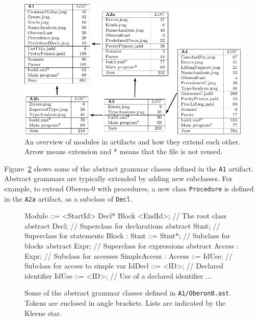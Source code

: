 \begin{figure}[h]
\begin{center}
\includegraphics{jastadd/artifacts-overview.pdf}
\caption{An overview of modules in artifacts and how they extend each other. Arrow means extension and * means that the file is not reused.}
\label{JA-ArtifactsOverview}
\end{center}
\end{figure}

Figure~\ref{JA-AbsGram} shows some of the abstract grammar classes defined in the \texttt{A1} artifact. Abstract grammars are typically extended by adding new subclasses. For example, to extend Oberon-0 with procedures, a new class \texttt{Procedure} is defined in the \texttt{A2a} artifact, as a subclass of \texttt{Decl}.

\begin{figure}[h]\footnotesize
\begin{jastaddcode}
Module ::= <StartId> Decl* Block <EndId>; // The root class
abstract Decl;                     // Superclass for declarations
abstract Stmt;                     // Superclass for statements
Block : Stmt ::= Stmt*;            // Subclass for blocks
abstract Expr;                     // Superclass for expressions
abstract Access : Expr;            // Subclass for accesses
SimpleAccess : Access ::= IdUse;   // Subclass for access to simple var
IdDecl ::= <ID>;                   // Declared identifier
IdUse ::= <ID>;                    // Use of a declared identifier
...
\end{jastaddcode}
\vspace{-15pt}
\caption{Some of the abstract grammar classes defined in \texttt{A1/Oberon0.ast}. Tokens are enclosed in angle brackets. Lists are indicated by the Kleene star.}
\label{JA-AbsGram}
\end{figure}

